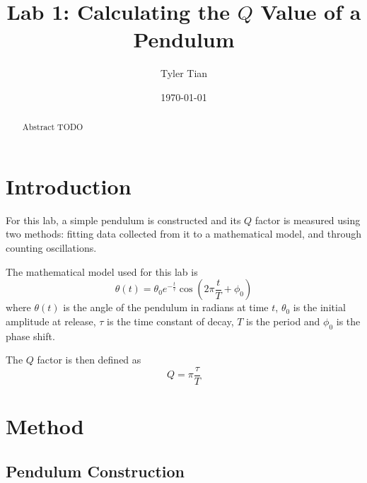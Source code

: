 \documentclass[aps,twocolumn,secnumarabic,nobalancelastpage,amsmath,amssymb,nofootinbib]{revtex4}
\begin{document}
\title{Lab 1: Calculating the \(Q\) Value of a Pendulum}
\author{Tyler Tian}
\date{\today}


\begin{abstract}
Abstract TODO
\end{abstract}

\maketitle


\section{Introduction}

For this lab, a simple pendulum is constructed and its \(Q\) factor is measured using two methods:
fitting data collected from it to a mathematical model, and through counting oscillations.

The mathematical model used for this lab is
\begin{equation}
    \theta(t) = \theta_0 e^{-\frac{t}{\tau}}\cos\left(2\pi\frac{t}{T} + \phi_0\right)
    \label{eqn:model}
\end{equation}
where $\theta(t)$ is the angle of the pendulum in radians at time $t$, $\theta_0$ is the initial amplitude at release,
$\tau$ is the time constant of decay, $T$ is the period and $\phi_0$ is the phase shift.

The \(Q\) factor is then defined as
\begin{equation}
    Q = \pi\frac{\tau}{T}
    \label{eqn:q}
\end{equation}


\section{Method}

\subsection{Pendulum Construction}
\end{document}
